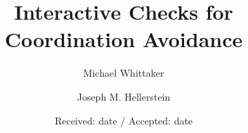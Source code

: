 \documentclass[twocolumn]{svjour3}
\begin{document}
  \title{Interactive Checks for Coordination Avoidance}

  \author{Michael Whittaker \and Joseph M. Hellerstein}


  \date{Received: date / Accepted: date}

  \maketitle
  {}

  {}
  {}
  {}
  {}
  {}
  {}
  {}
  {}
  {}
  {}

  
  
\end{document}
